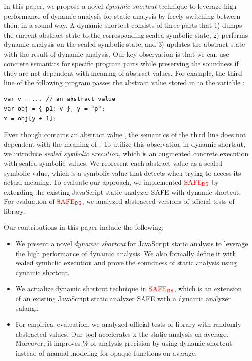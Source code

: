 In this paper, we propose a novel \textit{dynamic shortcut} technique to
leverage high performance of dynamic analysis for static analysis by freely
switching between them in a sound way.  A dynamic shortcut consists of three
parts that 1) dumps the current abstract state to the corresponding sealed
symbolic state, 2) performs dynamic analysis on the sealed symbolic state, and
3) updates the abstract state with the result of dynamic analysis.  Our key
observation is that we can use concrete semantics for specific program parts
while preserving the soundness if they are not dependent with meaning of
abstract values.  For example, the third line of the following program passes
the abstract value  stored in  to the variable
:
\begin{lstlisting}[style=myJSstyle,numbers=none]
var v = ... // an abstract value
var obj = { p1: v }, y = "p";
x = obj[y + 1];
\end{lstlisting}
Even though  contains an abstract value , the semantics of
the third line does not dependent with the meaning of .  To utilize
this observation in dynamic shortcut, we introduce \textit{sealed symbolic
execution}, which is an augmented concrete execution with sealed symbolic
values.  We represent each abstract value as a sealed symbolic value, which is a
symbolic value that detects when trying to access its actual meaning.  To
evaluate our approach, we implemented ${\color{red}{\text{SAFE}_{\textsf{DS}}}}$ by extending the existing
JavaScript static analyzer SAFE with dynamic shortcut.  For evaluation of
${\color{red}{\text{SAFE}_{\textsf{DS}}}}$, we analyzed abstracted versions of  official tests of
 library.

Our contributions in this paper include the following:
\begin{itemize}
  \item We present a novel \textit{dynamic shortcut} for JavaScript static
    analysis to leverage the high performance of dynamic analysis.  We also
    formally define it with sealed symbolic execution and prove the soundness of
    static analysis using dynamic shortcut.
  \item We actualize dynamic shortcut technique in ${\color{red}{\text{SAFE}_{\textsf{DS}}}}$, which is an
    extension of an existing JavaScript static analyzer SAFE with a dynamic
    analyzer Jalangi.
  \item For empirical evaluation, we analyzed  official tests of
     library with randomly abstracted values.  Our tool
    accelerates x the static analysis on average.  Moreover, it
    improves \% of analysis precision by using dynamic shortcut
    instead of manual modeling for  opaque functions on average.
\end{itemize}

